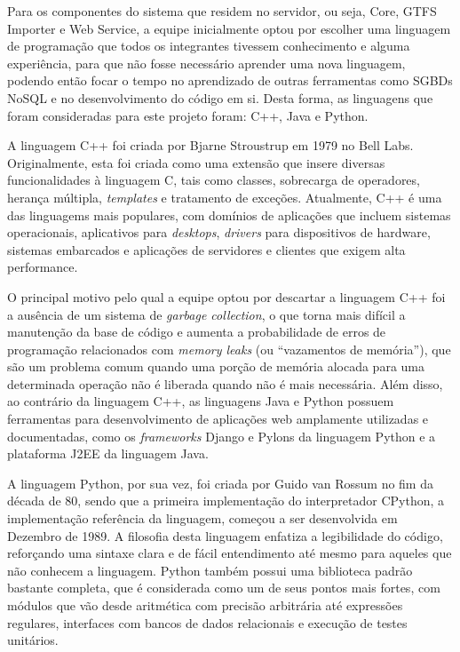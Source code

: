 Para os componentes do sistema que residem no servidor, ou seja, Core, GTFS Importer e Web Service, a equipe inicialmente optou por escolher uma linguagem de programação que todos os integrantes tivessem conhecimento e alguma experiência, para que não fosse necessário aprender uma nova linguagem, podendo então focar o tempo no aprendizado de outras ferramentas como SGBDs NoSQL e no desenvolvimento do código em si.
Desta forma, as linguagens que foram consideradas para este projeto foram: C++, Java e Python.


A linguagem C++ foi criada por Bjarne Stroustrup em 1979 no Bell Labs.
Originalmente, esta foi criada como uma extensão que insere diversas funcionalidades à linguagem C, tais como classes, sobrecarga de operadores, herança múltipla, \emph{templates} e tratamento de exceções.
Atualmente, C++ é uma das linguagems mais populares, com domínios de aplicações que incluem sistemas operacionais, aplicativos para \emph{desktops}, \emph{drivers} para dispositivos de hardware, sistemas embarcados e aplicações de servidores e clientes que exigem alta performance.

O principal motivo pelo qual a equipe optou por descartar a linguagem C++ foi a ausência de um sistema de \emph{garbage collection}, o que torna mais difícil a manutenção da base de código e aumenta a probabilidade de erros de programação relacionados com \emph{memory leaks} (ou ``vazamentos de memória''), que são um problema comum quando uma porção de memória alocada para uma determinada operação não é liberada quando não é mais necessária.
Além disso, ao contrário da linguagem C++, as linguagens Java e Python possuem ferramentas para desenvolvimento de aplicações web amplamente utilizadas e documentadas, como os \emph{frameworks} Django e Pylons da linguagem Python e a plataforma J2EE da linguagem Java.

A linguagem Python, por sua vez, foi criada por Guido van Rossum no fim da década de 80, sendo que a primeira implementação do interpretador CPython, a implementação referência da linguagem, começou a ser desenvolvida em Dezembro de 1989.
A filosofia desta linguagem enfatiza a legibilidade do código, reforçando uma sintaxe clara e de fácil entendimento até mesmo para aqueles que não conhecem a linguagem.
Python também possui uma biblioteca padrão bastante completa, que é considerada como um de seus pontos mais fortes, com módulos que vão desde aritmética com precisão arbitrária até expressões regulares, interfaces com bancos de dados relacionais e execução de testes unitários.

